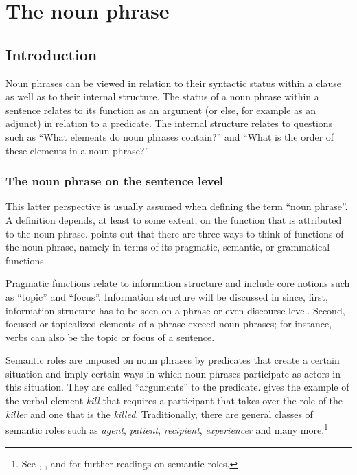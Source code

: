 \chapter{The noun phrase}
\label{sec:NP}

\section{Introduction}
\label{sec:NPIntro}




Noun phrases can be viewed in relation to their syntactic status within a clause as well as to their internal structure. The status of a noun phrase within a sentence relates to its function as an argument (or else, for example as an adjunct) in relation to a predicate. The internal structure relates to questions such as ``What elements do noun phrases contain?'' and ``What is the order of these elements in a noun phrase?''  

\subsection*{The noun phrase on the sentence level} This latter perspective is usually assumed when defining the term ``noun phrase''. A definition depends, at least to some extent, on the function that is attributed to the noun phrase. \citet[132]{andrews2007} points out that there are three ways to think of functions of the noun phrase, namely in terms of its pragmatic, semantic,  or grammatical functions.

Pragmatic functions relate to information structure and include core notions such as ``topic'' and ``focus''. Information structure will be discussed in  since, first, information structure has to be seen on a phrase or even discourse level. Second, focused or topicalized elements of a phrase exceed noun phrases; for instance, verbs can also be the topic or focus of a sentence.

Semantic roles are imposed on noun phrases by predicates that create a certain situation and imply certain ways in which noun phrases participate as actors in this situation. They are called ``arguments'' to the predicate. \citet[135]{andrews2007} gives the example of the verbal element {\itshape kill} that requires a participant that takes over the role of the {\itshape killer} and one that is the {\itshape killed}.  Traditionally, there are general classes of semantic roles such as {\itshape agent}, {\itshape patient}, {\itshape recipient}, {\itshape experiencer} and many more.\footnote{See \citet{jackendoff90}, \citet{andrews2007}, and \citet{levin2005} for further readings on semantic roles.} 


